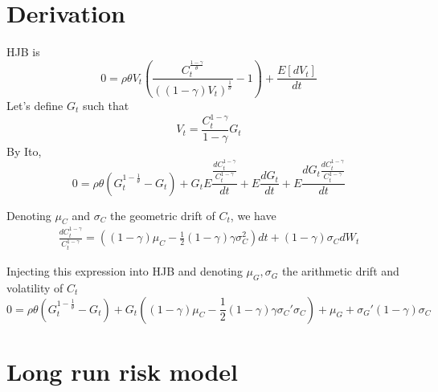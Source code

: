 \documentclass[english]{article}
\begin{document}
\section{Derivation}
HJB is
$$0 = \rho \theta V_t(\frac{C_t^{\frac{1-\gamma}{\theta}}}{((1-\gamma)V_t)^{\frac{1}{\theta}}}-1) + \frac{E[dV_t]}{dt}$$
Let's define $G_t$ such that
$$V_t = \frac{C_t^{1-\gamma}}{1-\gamma} G_t$$
By Ito, 
$$0 = \rho\theta(G_t^{1-\frac{1}{\theta}}-G_t)   +  G_t E\frac{\frac{dC_t^{1-\gamma}}{C_t^{1-\gamma}}}{dt} + E\frac{dG_t}{dt} + E\frac{dG_t\frac{dC_t^{1-\gamma}}{C_t^{1-\gamma}}}{dt}$$

Denoting $\mu_{C}$ and $\sigma_{C}$ the geometric drift of $C_t$, we have
\begin{align*}
	\frac{dC_{t}^{1-\gamma}}{C_{t}^{1-\gamma}}=((1-\gamma)\mu_{C}-\frac{1}{2}(1-\gamma)\gamma\sigma^{2}_{C})dt + (1-\gamma)\sigma_{C}dW_t
\end{align*}


Injecting this expression into HJB and denoting $\mu_G, \sigma_G$ the arithmetic drift and volatility of $C_t$
$$0 = \rho \theta (G_t^{1-\frac{1}{\theta}}-G_t)  + G_t ((1-\gamma) \mu_{C} - \frac{1}{2}(1-\gamma)\gamma\sigma_{C}'\sigma_{C}) +  \mu_G + \sigma_G'(1-\gamma)\sigma_{C}$$

\section{Long run risk model}
\end{document}
